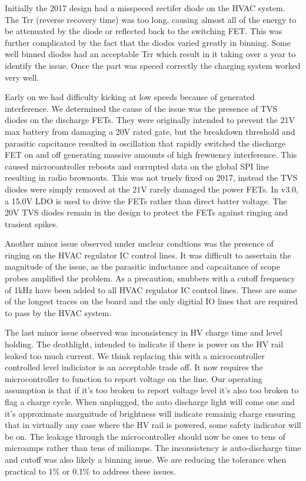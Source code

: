 \documentclass[12pt, letterpaper]{article}
\begin{document}
Initially the 2017 design had a misspeced rectifer diode on the HVAC system. The Trr (reverse recovery time) was too long, causing almost all of the energy to be attenuated by the diode or reflected back to the switching FET. This was further complicated by the fact that the diodes varied greatly in binning. Some well binned diodes had an acceptable Trr which result in it taking over a year to identify the issue. Once the part was speced correctly the charging system worked very well.

Early on we had difficulty kicking at low speeds because of generated interference. We determined the cause of the issue was the presence of TVS diodes on the discharge FETs. They were originally intended to prevent the 21V max battery from damaging a 20V rated gate, but the breakdown threshold and parasitic capcitance resulted in oscillation that rapidly switched the discharge FET on and off generating massive amounts of high frewuency interference. This caused microcontroller reboots and corrupted data on the global SPI line resulting in radio brownouts. This was not truely fixed on 2017, instead the TVS diodes were simply removed at the 21V rarely damaged the power FETs. In v3.0, a 15.0V LDO is used to drive the FETs rather than direct batter voltage. The 20V TVS diodes remain in the design to protect the FETs against ringing and trasient spikes. 

Another minor issue observed under unclear condtions was the presence of ringing on the HVAC regulator IC control lines. It was difficult to assertain the magnitude of the issue, as the parasitic inductance and capcaitance of scope probes amplified the problem. As a precaution, snubbers with a cutoff frequency of 1kHz have been added to all HVAC regulator IC control lines. These are some of the longest traces on the board and the only digitial IO lines that are required to pass by the HVAC system.

The last minor issue observed was inconsistency in HV charge time and level holding. The deathlight, intended to indicate if there is power on the HV rail leaked too much current. We think replacing this with a microcontroller controlled level indiciator is an acceptable trade off. It now requires the microcontroller to function to report voltage on the line. Our operating assumption is that if it's too broken to report voltage level it's also too broken to flag a charge cycle. When unplugged, the auto discharge light will come one and it's approximate margnitude of brightness will indicate remainig charge ensuring that in virtually any case where the HV rail is powered, some safety indicator will be on. The leakage through the microcontroller should now be ones to tens of microamps rather than tens of miliamps. The inconsistency is auto-discharge time and cutoff was also likely a binning issue. We are reducing the tolerance when practical to 1\% or 0.1\% to address these issues.  
\end{document}
